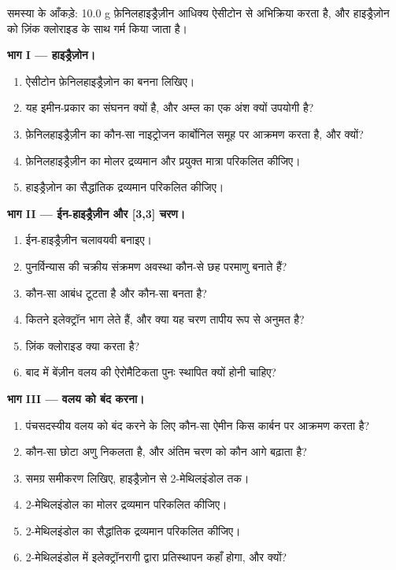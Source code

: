 \begin{problem}
\label{pb:b3:heterocycles:1}
समस्या के आँकड़े: 10.0 g फ़ेनिलहाइड्रैज़ीन आधिक्य ऐसीटोन से अभिक्रिया करता है, और
हाइड्रैज़ोन को ज़िंक क्लोराइड के साथ गर्म किया जाता है।

\medskip\noindent\textbf{भाग I --- हाइड्रैज़ोन।}
\begin{enumerate}
  \item ऐसीटोन फ़ेनिलहाइड्रैज़ोन का बनना लिखिए।
  \item यह इमीन-प्रकार का संघनन क्यों है, और अम्ल का एक अंश क्यों उपयोगी है?
  \item फ़ेनिलहाइड्रैज़ीन का कौन-सा नाइट्रोजन कार्बोनिल समूह पर आक्रमण करता है, और क्यों?
  \item फ़ेनिलहाइड्रैज़ीन का मोलर द्रव्यमान और प्रयुक्त मात्रा परिकलित कीजिए।
  \item हाइड्रैज़ोन का सैद्धांतिक द्रव्यमान परिकलित कीजिए।
\end{enumerate}

\medskip\noindent\textbf{भाग II --- ईन-हाइड्रैज़ीन और [3,3] चरण।}
\begin{enumerate}[resume]
  \item ईन-हाइड्रैज़ीन चलावयवी बनाइए।
  \item [3,3] पुनर्विन्यास की चक्रीय संक्रमण अवस्था कौन-से छह परमाणु बनाते हैं?
  \item कौन-सा आबंध टूटता है और कौन-सा बनता है?
  \item कितने इलेक्ट्रॉन भाग लेते हैं, और क्या यह चरण तापीय रूप से अनुमत है?
  \item ज़िंक क्लोराइड क्या करता है?
  \item बाद में बेंज़ीन वलय की ऐरोमैटिकता पुनः स्थापित क्यों होनी चाहिए?
\end{enumerate}

\medskip\noindent\textbf{भाग III --- वलय को बंद करना।}
\begin{enumerate}[resume]
  \item पंचसदस्यीय वलय को बंद करने के लिए कौन-सा ऐमीन किस कार्बन पर आक्रमण करता है?
  \item कौन-सा छोटा अणु निकलता है, और अंतिम चरण को कौन आगे बढ़ाता है?
  \item समग्र समीकरण लिखिए, हाइड्रैज़ोन से 2-मेथिलइंडोल तक।
  \item 2-मेथिलइंडोल का मोलर द्रव्यमान परिकलित कीजिए।
  \item 2-मेथिलइंडोल का सैद्धांतिक द्रव्यमान परिकलित कीजिए।
  \item 2-मेथिलइंडोल में इलेक्ट्रॉनरागी द्वारा प्रतिस्थापन कहाँ होगा, और क्यों?
\end{enumerate}


\end{problem}
